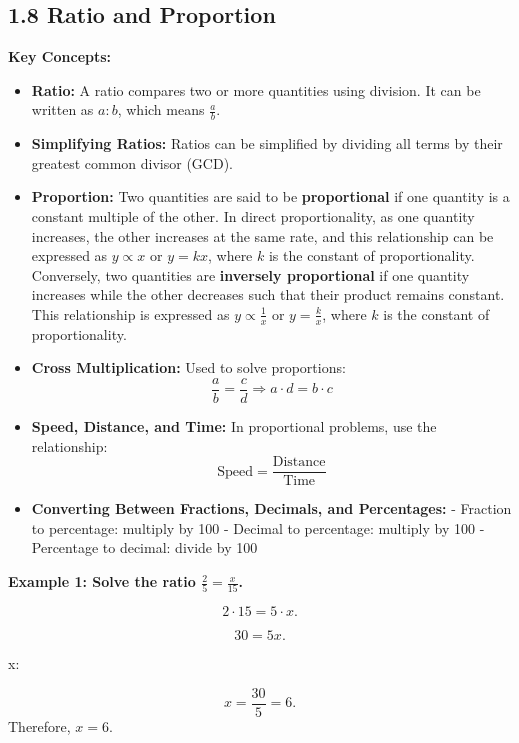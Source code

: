 

\subsection*{1.8 Ratio and Proportion}



\textbf{Key Concepts:}

\begin{itemize}
    \item \textbf{Ratio:} A ratio compares two or more quantities using division. It can be written as \( a : b \), which means \( \frac{a}{b} \).

    \item \textbf{Simplifying Ratios:} Ratios can be simplified by dividing all terms by their greatest common divisor (GCD).

    \item \textbf{Proportion:} Two quantities are said to be \textbf{proportional} if one quantity is a constant multiple of the other. In direct proportionality, as one quantity increases, the other increases at the same rate, and this relationship can be expressed as \( y \propto x \) or \( y = kx \), where \( k \) is the constant of proportionality. Conversely, two quantities are \textbf{inversely proportional} if one quantity increases while the other decreases such that their product remains constant. This relationship is expressed as \( y \propto \frac{1}{x} \) or \( y = \frac{k}{x} \), where \( k \) is the constant of proportionality.

    \item \textbf{Cross Multiplication:} Used to solve proportions:
    \[
    \frac{a}{b} = \frac{c}{d} \Rightarrow a \cdot d = b \cdot c
    \]

    \item \textbf{Speed, Distance, and Time:} In proportional problems, use the relationship:
    \[
    \text{Speed} = \frac{\text{Distance}}{\text{Time}}
    \]


    \item \textbf{Converting Between Fractions, Decimals, and Percentages:}  
    - Fraction to percentage: multiply by 100  
    - Decimal to percentage: multiply by 100  
    - Percentage to decimal: divide by 100
\end{itemize}





\begin{flushleft}
\textbf{Example 1: Solve the ratio $\frac{2}{5} = \frac{x}{15}$.}


\[
2 \cdot 15 = 5 \cdot x.
\]


\[
30 = 5x.
\]

 x:

\[
x = \frac{30}{5} = 6.
\]
Therefore, $x = 6$.
\end{flushleft}

